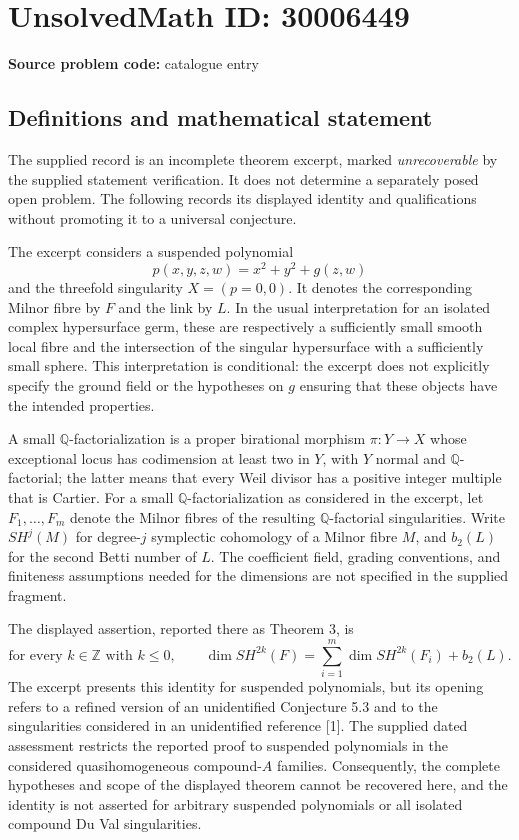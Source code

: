 \documentclass[11pt]{article}
\newcommand{\Z}{\mathbb{Z}}
\newcommand{\Q}{\mathbb{Q}}
\begin{document}
\section*{UnsolvedMath ID: 30006449}
\textbf{Source problem code:} catalogue entry
\subsection{Definitions and mathematical statement}
The supplied record is an incomplete theorem excerpt, marked \emph{unrecoverable} by the supplied statement verification. It does not determine a separately posed open problem. The following records its displayed identity and qualifications without promoting it to a universal conjecture.

The excerpt considers a suspended polynomial
\[
p(x,y,z,w)=x^2+y^2+g(z,w)
\]
and the threefold singularity \(X=(p=0,0)\). It denotes the corresponding Milnor fibre by \(F\) and the link by \(L\). In the usual interpretation for an isolated complex hypersurface germ, these are respectively a sufficiently small smooth local fibre and the intersection of the singular hypersurface with a sufficiently small sphere. This interpretation is conditional: the excerpt does not explicitly specify the ground field or the hypotheses on \(g\) ensuring that these objects have the intended properties.

A small \(\Q\)-factorialization is a proper birational morphism \(\pi:Y\to X\) whose exceptional locus has codimension at least two in \(Y\), with \(Y\) normal and \(\Q\)-factorial; the latter means that every Weil divisor has a positive integer multiple that is Cartier. For a small \(\Q\)-factorialization as considered in the excerpt, let \(F_1,\ldots,F_m\) denote the Milnor fibres of the resulting \(\Q\)-factorial singularities. Write \(SH^j(M)\) for degree-\(j\) symplectic cohomology of a Milnor fibre \(M\), and \(b_2(L)\) for the second Betti number of \(L\). The coefficient field, grading conventions, and finiteness assumptions needed for the dimensions are not specified in the supplied fragment.

The displayed assertion, reported there as Theorem 3, is
\[
\text{for every }k\in\Z\text{ with }k\leq 0,\qquad
\dim SH^{2k}(F)
=
\sum_{i=1}^{m}\dim SH^{2k}(F_i)+b_2(L).
\]
The excerpt presents this identity for suspended polynomials, but its opening refers to a refined version of an unidentified Conjecture 5.3 and to the singularities considered in an unidentified reference [1]. The supplied dated assessment restricts the reported proof to suspended polynomials in the considered quasihomogeneous compound-\(A\) families. Consequently, the complete hypotheses and scope of the displayed theorem cannot be recovered here, and the identity is not asserted for arbitrary suspended polynomials or all isolated compound Du Val singularities.
\end{document}
